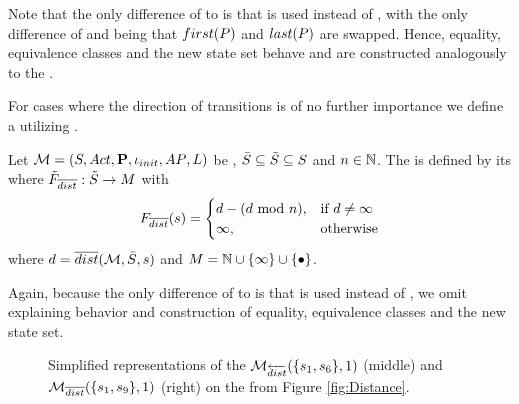 \documentclass[preview]{standalone}
\begin{document}
Note that the only difference of \viewdistancerev to \viewdistance is that \distpathrev is used instead of \distpath, with the only difference of \distpath and \distpathrev being that ${first}({P})$ and ${last}({P})$ are swapped. Hence, equality, equivalence classes and the new state set behave and are constructed analogously to the \viewN \viewdistance.

For cases where the direction of transitions is of no further importance we define a \viewN \viewdistancebi utilizing \distpathbi.

\begin{definition}
	Let ${{{\mathcal{M}}}} = {{({S}, {Act}, {\textbf{P}}, {\iota_{init}}, {AP}, {L})}}$ be \achgphN, $\bar{{S}} \subseteq {\tilde{\ensuremath{{S}}}} \subseteq {S}$ and $n \in {\mathbb{N}}$. The \viewN \viewdistancebi is defined by its \grpfctN \gfctdistancebi where ${{\tilde{F}_{{{\overline{dist}}}}}} : {\tilde{{S}}} \to {\ensuremath{{M}}}$ with 
	\[
	{{F_{{{\overline{dist}}}}}}({s}) =
	\begin{cases}
		{d} - ({d} \text{ mod } n), &\text{if } d \neq \infty \\
		\infty, &\text{otherwise}
	\end{cases}		
	\]
	where ${d} = {\overline{dist}}({{{\mathcal{M}}}},\bar{{S}}, {s})$ and $\imggrp = \natnums \cup \{\infty\} \cup \remset$.
\end{definition}

Again, because the only difference of \viewdistancebi to \viewdistance is that \distpathbi is used instead of \distpath, we omit explaining behavior and construction of equality, equivalence classes and the new state set.

\begin{figure}[h]
	\begin{minipage}{.5\textwidth}
		\hspace{15mm}		
		
	\end{minipage}%
	\begin{minipage}{.5\textwidth}
		\hspace{10mm}		
		
	\end{minipage}	
	\caption{Simplified representations of the \viewsN ${{{{{\mathcal{M}}}}_{{{\overleftarrow{dist}}}}}}(\{{s}_1, {s}_6\}, 1)$ (middle) and ${{{{{\mathcal{M}}}}_{{{\overline{dist}}}}}}(\{{s}_1, {s}_9\}, 1)$ (right) on the \chgph from Figure \ref{fig:Distance}.} 
	\label{fig:DistanceRevBi}  
\end{figure}

\end{document}
